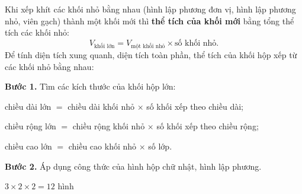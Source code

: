 \providecommand{\xhcuboid}{}\renewcommand{\xhcuboid}[7][tmBlue]{\begin{scope}[shift={({#2+0.5*(#3)},{#4+0.35*(#3)})}]
\filldraw[xhf,fill=#1!22] (0,0) rectangle (#5,#7);
\filldraw[xhf,fill=#1!8] (0,#7)--(#5,#7)--({#5+0.5*(#6)},{#7+0.35*(#6)})--({0.5*(#6)},{#7+0.35*(#6)})--cycle;
\filldraw[xhf,fill=#1!45] (#5,0)--({#5+0.5*(#6)},{0.35*(#6)})--({#5+0.5*(#6)},{#7+0.35*(#6)})--(#5,#7)--cycle;
\end{scope}}
\providecommand{\xhcube}{}\renewcommand{\xhcube}[4][tmBlue]{\xhcuboid[#1]{#2}{#3}{#4}{1}{1}{1}}

\begin{knowbox}
\begin{minipage}[t]{0.62\linewidth}
Khi xếp khít các khối nhỏ bằng nhau (hình lập phương đơn vị, hình lập phương nhỏ, viên gạch) thành một khối mới thì \textbf{thể tích của khối mới} bằng tổng thể tích các khối nhỏ:
\[V_{\text{khối lớn}}=V_{\text{một khối nhỏ}}\times\text{số khối nhỏ}.\]
Để tính diện tích xung quanh, diện tích toàn phần, thể tích của khối hộp xếp từ các khối nhỏ bằng nhau:\par
\smallskip
\textbf{Bước 1.} Tìm các kích thước của khối hộp lớn:\par
chiều dài lớn $=$ chiều dài khối nhỏ $\times$ số khối xếp theo chiều dài;\par
chiều rộng lớn $=$ chiều rộng khối nhỏ $\times$ số khối xếp theo chiều rộng;\par
chiều cao lớn $=$ chiều cao khối nhỏ $\times$ số lớp.\par
\smallskip
\textbf{Bước 2.} Áp dụng công thức của hình hộp chữ nhật, hình lập phương.
\end{minipage}\hfill
\begin{minipage}[t]{0.34\linewidth}\vspace{4pt}\centering
{}\par\smallskip
{\small $3\times2\times2=12$ hình}
\end{minipage}
\end{knowbox}

